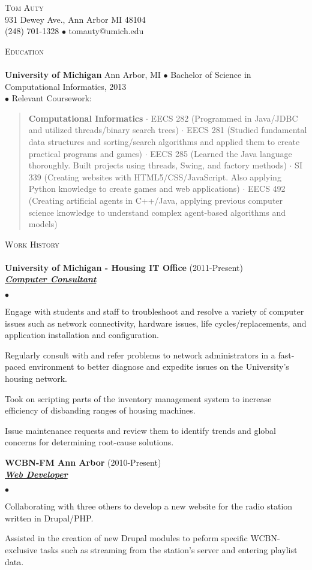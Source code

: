 \documentclass{article}
\newcommand{\area}[2]{\vspace*{-9pt} \begin{verse}\textbf{#1}   #2 \end{verse}  }
\newcommand{\lineunder}{\vspace*{-8pt} \\ \hspace*{-18pt} \hrulefill \\}
\newcommand{\header}[1]{{\hspace*{-15pt}\vspace*{6pt} \textsc{#1}} \vspace*{-6pt} \lineunder}
\newcommand{\employer}[3]{{ \textbf{#1} (#2)\\ \underline{\textbf{\emph{#3}}}\\  }}
\newcommand{\contact}[3]{
\vspace*{-4pt}
\begin{center}
{\LARGE \scshape {#1}}\\
#2 \\
#3
\end{center}
\vspace*{-8pt}
}
\newenvironment{achievements}{\begin{list}{$\bullet$}{\topsep 0pt \itemsep -2pt}}{\vspace*{4pt}\end{list}}
\newcommand{\schoolwithcourses}[4]{
 \textbf{#1} #2 $\bullet$ #3\\ 
#4 $\bullet$  Relevant Coursework:\\
\vspace*{8pt}
}
\begin{document}
\small
\smallskip
\vspace*{-44pt}

\contact{Tom Auty}
{931 Dewey Ave., Ann Arbor MI 48104}
{(248) 701-1328 $\bullet$ tomauty@umich.edu}

\header{Education}

\schoolwithcourses{University of Michigan}{Ann Arbor, MI}{Bachelor of Science in Computational Informatics, 2013}
{}
	\area{Computational Informatics}{ $\cdot$ EECS 282 (Programmed in Java/JDBC and utilized threads/binary search trees) $\cdot$ EECS 281 (Studied fundamental data structures and sorting/search algorithms and applied them to create practical programs and games) $\cdot$ EECS 285 (Learned the Java language thoroughly. Built projects using threads, Swing, and factory methods) $\cdot$ SI 339 (Creating websites with HTML5/CSS/JavaScript. Also applying Python knowledge to create games and web applications) $\cdot$ EECS 492 (Creating artificial agents in C++/Java, applying previous computer science knowledge to understand complex agent-based algorithms and models)}

\header{Work History}
\employer{University of Michigan - Housing IT Office}{2011-Present}{Computer Consultant}
	\begin{achievements}
	\item Engage with students and staff to troubleshoot and resolve a variety of computer issues such as network connectivity, hardware issues, life cycles/replacements, and application installation and configuration.
	\item Regularly consult with and refer problems to network administrators in a fast-paced environment to better diagnose and expedite issues on the University's housing network.
	\item Took on scripting parts of the inventory management system to increase efficiency of disbanding ranges of housing machines.
	\item Issue maintenance requests and review them to identify trends and global concerns for determining root-cause solutions.
	\end{achievements}

\employer{WCBN-FM Ann Arbor}{2010-Present}{Web Developer}
	\begin{achievements}
	\item Collaborating with three others to develop a new website for the radio station written in Drupal/PHP. 
	\item Assisted in the creation of new Drupal modules to peform specific WCBN-exclusive tasks such as streaming from the station's server and entering playlist data.
	\end{achievements}
\end{document}

